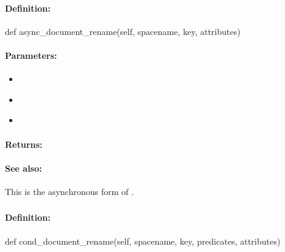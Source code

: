 \paragraph{Definition:}
\begin{pythoncode}
def async_document_rename(self, spacename, key, attributes)
\end{pythoncode}

\paragraph{Parameters:}
\begin{itemize}[noitemsep]
\item {}\\

\item {}\\

\item {}\\

\end{itemize}

\paragraph{Returns:}


\paragraph{See also:}  This is the asynchronous form of .

\pagebreak
\subsubsection{}
\label{api:python:cond_document_rename}


\paragraph{Definition:}
\begin{pythoncode}
def cond_document_rename(self, spacename, key, predicates, attributes)
\end{pythoncode}

